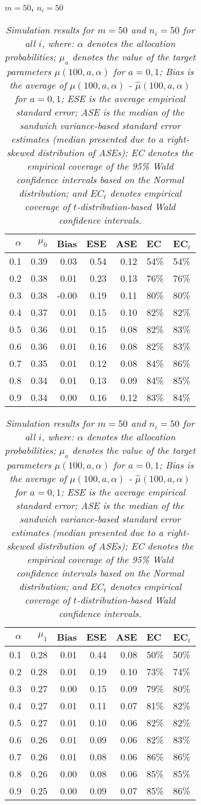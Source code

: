 \documentclass[12pt, letterpaper]{article}
\begin{document}
\begin{center}
	\textbf{$m=50$, $n_i=50$} 
\end{center}
\begin{table}[ht!]
	\centering
	\bgroup
	\def\arraystretch{1.25}
	\setlength\tabcolsep{0.05in}
	\begin{tabular}{rrrrrll}
		\hline
		$\alpha$ & $\mu_0$ & Bias & ESE & ASE & EC & EC$_t$ \\ 
		\hline
		0.1 & 0.39 & 0.03 & 0.54 & 0.12 & 54\% & 54\% \\ 
		0.2 & 0.38 & 0.01 & 0.23 & 0.13 & 76\% & 76\% \\ 
		0.3 & 0.38 & -0.00 & 0.19 & 0.11 & 80\% & 80\% \\ 
		0.4 & 0.37 & 0.01 & 0.15 & 0.10 & 82\% & 82\% \\ 
		0.5 & 0.36 & 0.01 & 0.15 & 0.08 & 82\% & 83\% \\ 
		0.6 & 0.36 & 0.01 & 0.16 & 0.08 & 82\% & 83\% \\ 
		0.7 & 0.35 & 0.01 & 0.12 & 0.08 & 84\% & 86\% \\ 
		0.8 & 0.34 & 0.01 & 0.13 & 0.09 & 84\% & 85\% \\ 
		0.9 & 0.34 & 0.00 & 0.16 & 0.12 & 83\% & 84\% \\ 
		\hline
	\end{tabular}
	\egroup
	\quad 
	\bgroup
	\setlength\tabcolsep{0.05in}
	\def\arraystretch{1.25}
	\begin{tabular}{rrrrrll}
		\hline
		$\alpha$ & $\mu_1$ & Bias & ESE & ASE & EC & EC$_t$ \\
		\hline
		0.1 & 0.28 & 0.01 & 0.44 & 0.08 & 50\% & 50\% \\ 
		0.2 & 0.28 & 0.01 & 0.19 & 0.10 & 73\% & 74\% \\ 
		0.3 & 0.27 & 0.00 & 0.15 & 0.09 & 79\% & 80\% \\ 
		0.4 & 0.27 & 0.01 & 0.11 & 0.07 & 81\% & 82\% \\ 
		0.5 & 0.27 & 0.01 & 0.10 & 0.06 & 82\% & 82\% \\ 
		0.6 & 0.26 & 0.01 & 0.09 & 0.06 & 82\% & 83\% \\ 
		0.7 & 0.26 & 0.01 & 0.08 & 0.06 & 86\% & 86\% \\ 
		0.8 & 0.26 & 0.00 & 0.08 & 0.06 & 85\% & 85\% \\ 
		0.9 & 0.25 & 0.00 & 0.09 & 0.07 & 85\% & 86\% \\     
		\hline
	\end{tabular}
	\egroup
	\caption*{\textit{Simulation results for $m = 50$ and $n_i = 50$ for all $i$, where: $\alpha$ denotes the allocation probabilities; $\mu_a$ denotes the value of the target parameters $\mu(100, a, \alpha)$ for $a=0,1$; Bias is the average of $\mu(100, a, \alpha)$ - $\hat{\mu}(100, a, \alpha)$ for $a=0, 1$; ESE is the average empirical standard error; ASE is the median of the sandwich variance-based standard error estimates (median presented due to a right-skewed distribution of ASEs); EC denotes the empirical coverage of the 95\% Wald confidence intervals based on the Normal distribution; and $EC_t$ denotes empirical coverage of $t$-distribution-based Wald confidence intervals.}}
\end{table}
\end{document}
